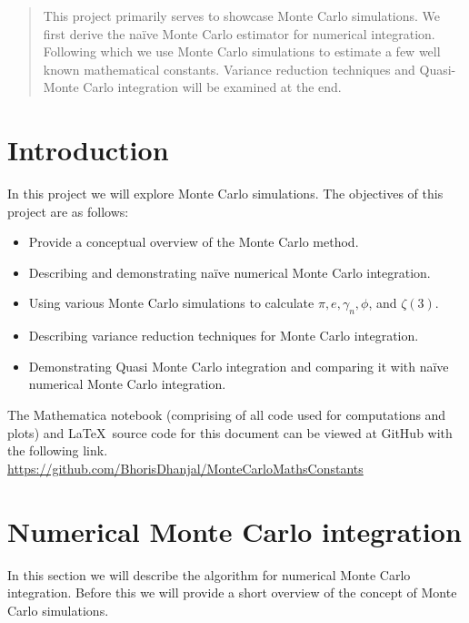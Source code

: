\documentclass[12pt]{article}
\makeatletter
\numberwithin{equation}{section}
\newcommand\mainmatter{%
    \cleardoublepage
  \pagenumbering{arabic}}
\makeatother
\begin{document}
\mainmatter
\maketitle
\begin{abstract}
    This project primarily serves to showcase Monte Carlo simulations. We first derive the naïve Monte Carlo estimator for numerical integration. Following which we use Monte Carlo simulations to estimate a few well known mathematical constants. Variance reduction techniques and Quasi-Monte Carlo integration will be examined at the end.
\end{abstract}
\section{Introduction} %
In this project we will explore Monte Carlo simulations.
The objectives of this project are as follows:
\begin{itemize}
    \item Provide a conceptual overview of the Monte Carlo method.
    \item Describing and demonstrating naïve numerical Monte Carlo integration.
    \item Using various Monte Carlo simulations to calculate $\pi, e, \gamma_n, \phi$, and $\zeta (3)$.
    \item Describing variance reduction techniques for Monte Carlo integration.
    \item Demonstrating Quasi Monte Carlo integration and comparing it with naïve numerical Monte Carlo integration.
\end{itemize}\par
The Mathematica notebook (comprising of all code used for computations and plots) and \LaTeX \ source code for this document can be viewed at GitHub with the following link.\\
\href{https://github.com/BhorisDhanjal/reciprocal-multifactorial-constants}{\faGithubSquare} \href{https://github.com/BhorisDhanjal/MonteCarloMathsConstants}{https://github.com/BhorisDhanjal/MonteCarloMathsConstants}
\vfill
\section{Numerical Monte Carlo integration}
In this section we will describe the algorithm for numerical Monte Carlo integration. Before this we will provide a short overview of the concept of Monte Carlo simulations.
\end{document}
